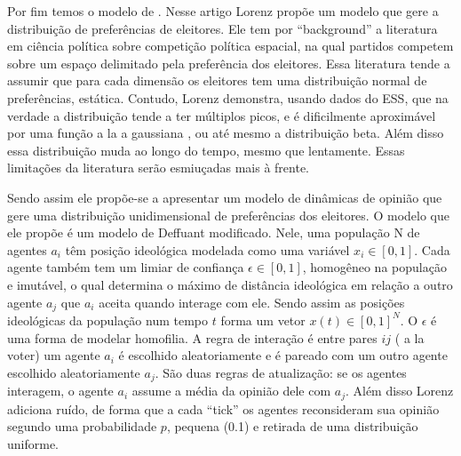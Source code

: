 Por fim temos o modelo de . Nesse artigo Lorenz
propõe um modelo que gere a distribuição de preferências de eleitores. Ele tem
por ``background'' a literatura em ciência política sobre competição política
espacial, na qual partidos competem sobre um espaço delimitado pela preferência
dos eleitores. Essa literatura tende a assumir que para cada dimensão os
eleitores tem uma distribuição normal de preferências, estática. Contudo, Lorenz
demonstra, usando dados do ESS, que na verdade a distribuição tende a
ter
múltiplos picos, e é dificilmente aproximável por uma função a la a gaussiana ,
ou até mesmo a distribuição beta. Além disso essa distribuição muda ao longo do
tempo, mesmo que lentamente. Essas limitações da literatura serão esmiuçadas
mais à frente.

Sendo assim ele propõe-se a apresentar um modelo de dinâmicas de opinião que
gere uma distribuição unidimensional de preferências dos eleitores. O modelo que
ele propõe é um modelo de Deffuant modificado. Nele, uma população N de agentes
$a_i$ têm posição ideológica modelada como uma variável $x_i \in [0,1]$. Cada
agente também tem um limiar de confiança $\epsilon \in [0,1]$, homogêneo na população e
imutável, o qual determina o máximo de distância ideológica em relação a outro
agente $a_j$ que $a_i$ aceita quando interage com ele. Sendo assim as posições
ideológicas da população num tempo $t$ forma um vetor $x(t) \in [0,1]^N$. O $\epsilon$ é
uma forma de modelar homofilia. A regra de interação é entre pares $ij$ ( a la
voter) um agente $a_i$ é escolhido aleatoriamente e é pareado com um outro
agente escolhido aleatoriamente $a_j$. São duas regras de atualização: se os
agentes interagem, o agente $a_i$ assume a média da opinião dele com $a_j$. Além
disso Lorenz adiciona ruído, de forma que a cada ``tick'' os agentes
reconsideram sua opinião segundo uma probabilidade $p$, pequena (0.1) e retirada
de uma distribuição uniforme.
